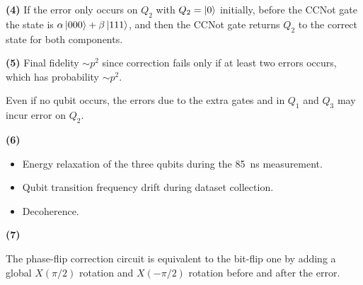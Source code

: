 \documentclass{article}
\makeatletter
\newcommand*{\shifttext}[1]{%
  \settowidth{\@tempdima}{#1}%
  \hspace{-\@tempdima}#1%
}
\newcommand{\plabel}[1]{%
\shifttext{\textbf{#1}\quad}%
}
\newcommand{\minusbaseline}{\abovedisplayskip=0pt\abovedisplayshortskip=0pt~\vspace*{-\baselineskip}}%
\makeatother
\begin{document}
\plabel{(4)}%
If the error only occurs on $Q_2$ with $Q_2 = \ket{0}$ initially, before the CCNot gate the state is $\alpha\ket{000} + \beta\ket{111}$, and then the CCNot gate returns $Q_2$ to the correct state for both components.

\plabel{(5)}%
Final fidelity $\sim p^2$ since correction fails only if at least two errors occurs, which has probability $\sim p^2$.
\par
Even if no qubit occurs, the errors due to the extra gates and in $Q_1$ and $Q_3$ may incur error on $Q_2$.

\plabel{(6)}%
\begingroup\minusbaseline
\begin{itemize}
    \item Energy relaxation of the three qubits during the \SI{85}{\nano\second} measurement.
    \item Qubit transition frequency drift during dataset collection.
    \item Decoherence.
\end{itemize}
\endgroup

\plabel{(7)}
The phase-flip correction circuit is equivalent to the bit-flip one by adding a global $X(\pi/2)$ rotation and $X(-\pi/2)$ rotation before and after the error.

% 
% 
\end{document}
